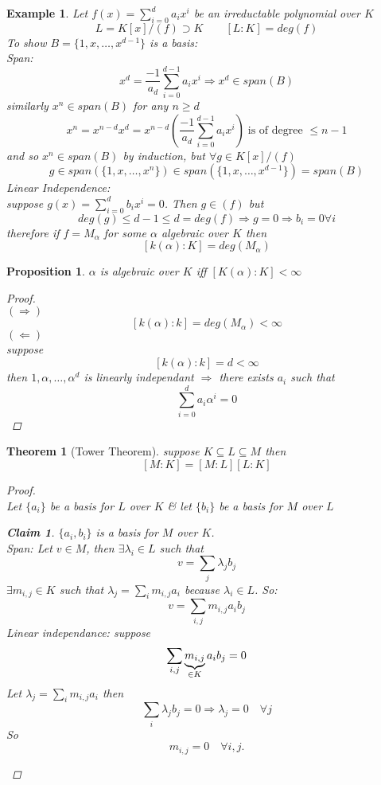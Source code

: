 \documentclass[12pt]{article}
\newtheorem{theorem}{Theorem}[section]
\newtheorem{example}{Example}[section]
\newtheorem{proposition}{Proposition}[section]
\newtheorem*{claim}{Claim}
\begin{document}
\begin{example}
Let $f(x) =\sum_{i=0}^{d}a_ix^i$ be an irreductable polynomial over $K$
\[L=K[x]/(f) \supset K \qquad [L:K] = deg(f) \]
To show $B = \{1, x ,\dots , x^{d-1}\}$ is a basis:\\
Span: 
\[x^d = \frac{-1}{a_d}\sum_{i=0}^{d-1}a_ix^i \Rightarrow x^d \in span(B)\]
similarly $x^n \in span(B)$ for any $n \geq d$
\[x^n = x^{n-d}x^d = x^{n-d}\left( \frac{-1}{a_d}\sum_{i=0}^{d-1}a_ix^i \right) \; \text{is of degree } \leq n-1 \]
and so  $x^n \in span(B)$ by induction, but $\forall g \in K[x]/(f)$
\[ g \in span( \{1, x ,\dots , x^{n}\}) \in span( \{1, x ,\dots , x^{d-1}\}) = span( B)\]
Linear Independence:\\
suppose $g(x) = \sum_{i=0}^{d}b_ix^i = 0$. Then $g \in (f)$ but 
\[deg(g) \leq d-1 \leq d = deg(f) \Rightarrow g=0 \Rightarrow b_i =0 \forall i\]
therefore if $f=M_{\alpha}$ for some $\alpha$ algebraic over $K$ then
\[ [k(\alpha): K] = deg(M_{\alpha}) \]
\end{example}

\begin{proposition}
$\alpha$ is algebraic over $K$ iff $[K(\alpha):K] < \infty$
\begin{proof} \quad \\ 
$(\Rightarrow)$
 \[[k(\alpha):k] = deg(M_{\alpha}) < \infty \]
$(\Leftarrow)$ \\ 
suppose 
\[[k(\alpha):k] = d < \infty\] 
then $1,\alpha, \dots, \alpha^d$ is linearly independant $\Rightarrow$ there exists $a_i$ such that \[\sum_{i=0}^{d}a_i\alpha^i =0 \]
\end{proof}
\end{proposition}

\begin{theorem}[Tower Theorem]\label{Tower}
suppose $K \subseteq L \subseteq M$ then
\[ [M:K]=[M:L][L:K] \]
\begin{proof} \quad \\
Let $\{a_i\}$ be a basis for $L$ over $K$ \& let $\{b_i\}$ be a basis for $M$ over $L$
\begin{claim} $\{a_i , b_i \}$ is a basis for $M$ over $K$.\\
Span: Let $v \in M$, then $\exists \lambda_i \in L$ such that
\[v = \sum_j\lambda_jb_j \]
$\exists m_{i,j} \in K$ such that $\lambda_j= \sum_im_{i,j}a_i$ because $\lambda_i \in L$. So:
\[v = \sum_{i,j}m_{i,j}a_ib_j\]
Linear independance: suppose 
\[ \sum_{i,j}\underbrace{m_{i,j}}_{\mathclap{\in K}}a_ib_j = 0\]
Let $\lambda_j= \sum_im_{i,j}a_i$ then 
\[\sum_i\lambda_jb_j = 0 \Rightarrow \lambda_j = 0 \quad \forall j\]
So 
\[m_{i,j} = 0 \quad \forall i,j. \]
\end{claim}
\end{proof}
\end{theorem}
\end{document}
